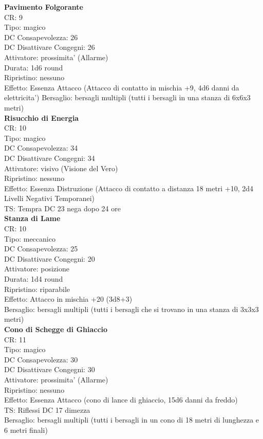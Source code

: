 \documentclass[a4paper,11pt,twoside,openany]{book}
\begin{document}
{\begin{multicols}{2}
\textbf{Pavimento Folgorante}\\
CR: 9 \\
Tipo: magico \\
DC Consapevolezza: 26 \\
DC Disattivare Congegni: 26 \\
Attivatore: prossimita' (Allarme) \\
Durata: 1d6 round \\
Ripristino: nessuno \\
Effetto: Essenza Attacco (Attacco di contatto in mischia +9, 4d6 danni da elettricita') 
Bersaglio: bersagli multipli (tutti i bersagli in una stanza di 6x6x3 metri)\\

\textbf{Risucchio di Energia}\\
CR: 10 \\
Tipo: magico \\
DC Consapevolezza: 34 \\
DC Disattivare Congegni: 34 \\
Attivatore: visivo (Visione del Vero) \\
Ripristino: nessuno \\
Effetto: Essenza Distruzione (Attacco di contatto a distanza 18 metri +10, 2d4 Livelli Negativi Temporanei) \\
TS: Tempra DC 23 nega dopo 24 ore\\

\textbf{Stanza di Lame}\\
CR: 10 \\
Tipo: meccanico \\
DC Consapevolezza: 25 \\
DC Disattivare Congegni: 20 \\
Attivatore: posizione \\
Durata: 1d4 round \\
Ripristino: riparabile \\
Effetto: Attacco in mischia +20 (3d8+3) \\
Bersaglio: bersagli multipli (tutti i bersagli che si trovano in una stanza di 3x3x3 metri)\\

\textbf{Cono di Schegge di Ghiaccio}\\
CR: 11 \\
Tipo: magico \\
DC Consapevolezza: 30 \\
DC Disattivare Congegni: 30 \\
Attivatore: prossimita' (Allarme) \\
Ripristino: nessuno \\
Effetto: Essenza Attacco (cono di lance di ghiaccio, 15d6 danni da freddo) \\
TS: Riflessi DC 17 dimezza \\
Bersaglio: bersagli multipli (tutti i bersagli in un cono di 18 metri di lunghezza e 6 metri finali)\\


\end{multicols}}
\end{document}
